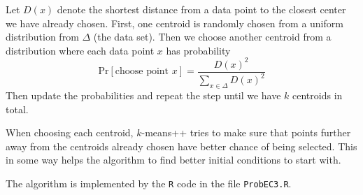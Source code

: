 \documentclass[a4paper,11pt]{article}
\newcommand{\code}[1]{\texttt{#1}}
\begin{document}
Let $D(x)$
denote the shortest distance from a data point to the closest center we have already chosen. First, one centroid is randomly chosen from a uniform distribution from $\Delta$ (the data set). Then we choose another centroid from a distribution where each data point $x$ has probability
\[
    \text{Pr}[\text{choose point } x] = \frac{D(x)^2}{\sum_{x\in \Delta} D(x)^2}
\]
Then update the probabilities and repeat the step until we have $k$ centroids in total. 

When choosing each centroid, $k$-means++ tries to make sure that points further away from the centroids already chosen have better chance of being selected. This in some way helps the algorithm to find better initial conditions to start with.

The algorithm is implemented by the \code{R} code in the file \code{ProbEC3.R}.
 
\end{document}
